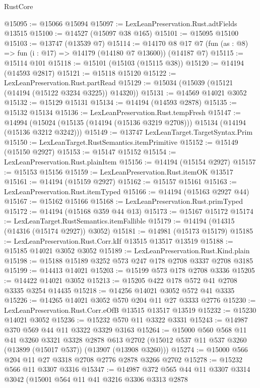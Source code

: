 \begin{lexlean}{RustCore}
\begin{coremodule}
@15095 := @15066 @15094
@15097 := LexLeanPreservation.Rust.adtFields @13515
@15100 := @14527 (@15097 @38 @165)
@15101 := @15095 @15100
@15103 := @13747 (@13539 @7)
@15114 := @14170 @8 @17 @7 (fun (as : @8) => fun (i : @17) => @14179 (@14180 @7 @13600)) (@14187 @7)
@15115 := @15114 @101
@15118 := @15101 (@15103 (@15115 @38))
@15120 := @14194 (@14593 @2817)
@15121 := @15118 @15120
@15122 := LexLeanPreservation.Rust.partRead
@15129 := @15034 (@15039 (@15121 (@14194 (@15122 @3234 @3225)) @14320))
@15131 := @14569 @14021 @3052
@15132 := @15129 @15131
@15134 := @14194 (@14593 @2878)
@15135 := @15132 @15134
@15136 := LexLeanPreservation.Rust.tempFresh
@15147 := @14994
    (@15024 (@15135 (@14194 (@15136 @3219 @2708))) @15134 (@14194 (@15136 @3212 @3242)))
@15149 := @13747 LexLeanTarget.TargetSyntax.Prim
@15150 := LexLeanTarget.RustSemantics.itemPrimitive
@15152 := @15149 (@15150 @2927)
@15153 := @15147 @15152
@15154 := LexLeanPreservation.Rust.plainItem
@15156 := @14194 (@15154 @2927)
@15157 := @15153 @15156
@15159 := LexLeanPreservation.Rust.itemOK @13517
@15161 := @14194 (@15159 @2927)
@15162 := @15157 @15161
@15163 := LexLeanPreservation.Rust.itemTyped
@15166 := @14194 (@15163 @2927 @44)
@15167 := @15162 @15166
@15168 := LexLeanPreservation.Rust.primTyped
@15172 := @14194 (@15168 @359 @44 @13)
@15173 := @15167 @15172
@15174 := LexLeanTarget.RustSemantics.itemFallible
@15179 := @14194 (@14315 (@14316 (@15174 @2927)) @3052)
@15181 := @14981 (@15173 @15179)
@15185 := LexLeanPreservation.Rust.Corr.kIf @13515 @13517 @13519
@15188 := @15185 @14021 @3052 @3052
@15189 := LexLeanPreservation.Rust.Kind.plain
@15198 := @15188 @15189 @3252 @573 @247 @178 @2708 @3337 @2708 @3185
@15199 := @14413 @14021
@15203 := @15199 @573 @178 @2708 @3336
@15205 := @14422 @14021 @3052
@15213 := @15205 @422 @178 @572 @41 @2708 @3335 @3254 @14435
@15218 := @14256 @14021 @3052 @572 @41 @3335
@15226 := @14265 @14021 @3052 @570 @204 @11 @27 @3333 @2776
@15230 := LexLeanPreservation.Rust.Corr.eOfB @13515 @13517 @13519
@15232 := @15230 @14021 @3052
@15236 := @15232 @570 @11 @3322 @3331
@15243 := @14987 @370 @569 @44 @11 @3322 @3329 @3163
@15264 := @15000
    @560
    @568
    @11
    @41
    @3260
    @3321
    @3328
    @2878
    @613
    @2702
    (@15012 @537 @11 @537 @3260 (@13899 (@15017 @537)) (@13907 (@13908 @3260)))
@15274 := @15000 @566 @204 @11 @27 @3318 @2708 @2776 @2878 @3266 @2702
@15278 := @15232 @566 @11 @3307 @3316
@15347 := @14987
    @372
    @565
    @44
    @11
    @3307
    @3314
    @3042
    (@15001
      @564
      @11
      @41
      @3216
      @3306
      @3313
      @2878

\end{coremodule}
\end{lexlean}
